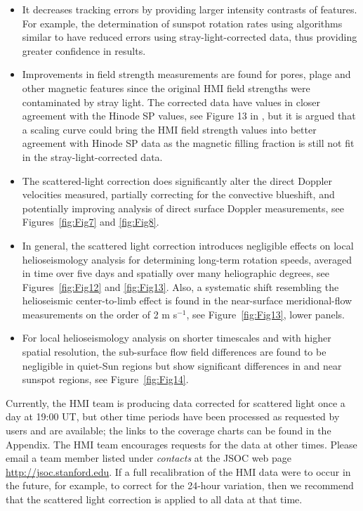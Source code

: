 \documentclass[trackchanges]{aastex62}
\begin{document}
\begin{itemize}
\item It decreases tracking errors by providing larger intensity contrasts of features. For example, the determination of sunspot rotation rates using algorithms similar to \citet{brown:2021} have reduced errors using stray-light-corrected data, thus providing greater confidence in results. 

\item  Improvements in field strength measurements are found for pores, plage and other  magnetic features since the original HMI field strengths were contaminated by stray light. The corrected data have values in closer agreement with the Hinode SP values, see Figure 13 in \citet{beck:2025}, but it is argued that a scaling curve could bring the HMI field strength values into better agreement with Hinode SP \citep{tsuneta:2008} data as the magnetic filling fraction is still not fit in the stray-light-corrected data. 

\item The scattered-light correction does significantly alter the direct Doppler velocities measured, partially correcting for the convective blueshift, and potentially improving analysis of direct surface Doppler measurements, see Figures~\ref{fig:Fig7} and  \ref{fig:Fig8}.

\item 
In general, the scattered light correction introduces negligible effects on local helioseismology analysis for determining long-term rotation speeds, averaged in time over five days and spatially over many heliographic degrees, see Figures~\ref{fig:Fig12} and \ref{fig:Fig13}. Also, a systematic shift resembling the helioseismic center-to-limb effect is found in the near-surface meridional-flow measurements on the order of 2 m s$^{-1}$, see Figure~\ref{fig:Fig13}, lower panels. 

\item For local helioseismology analysis on shorter timescales and with higher spatial resolution, the sub-surface flow field differences are found to be negligible in quiet-Sun regions but show significant differences in and near sunspot regions, see Figure~\ref{fig:Fig14}.

\end{itemize}

Currently, the HMI team is producing data corrected for scattered light once a day at 19:00 UT, but other time periods have been processed as requested by users and are available; the links to the coverage charts can be found in the Appendix. The HMI team encourages requests for the data at other times. Please email a team member listed under \textit{contacts} at the JSOC web page \href{http://jsoc.stanford.edu}{http://jsoc.stanford.edu}. If a full recalibration of the HMI data were to occur in the future, for example, to correct for the 24-hour variation, then we recommend that the scattered light correction is applied to all data at that time. 
\end{document}
